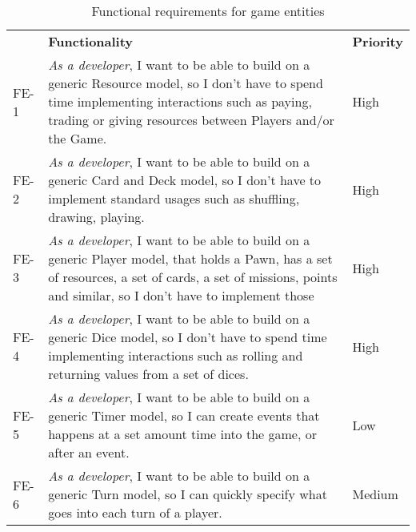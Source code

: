 \begin{table}
\centering
\caption{Functional requirements for game entities}
\label{freq:game_entities}
\begin{tabular}{ | m{1cm} | m{9cm}| m{1.5cm} | }
     & {\bf Functionality}                                                                                                                                                                                                                                                                                                     & {\bf Priority} \\
FE-1 & \emph{As a developer}, I want to be able to build on a generic Resource model, so I don't have to spend time implementing interactions such as paying, trading or giving resources between Players and/or the Game.                                                                 & High           \\
FE-2 & \emph{As a developer}, I want to be able to build on a generic Card and Deck model, so I don't have to implement standard usages such as shuffling, drawing, playing.                                                                                                                                                          & High           \\
FE-3 & \emph{As a developer}, I want to be able to build on a generic Player model, that holds a Pawn, has a set of resources, a set of cards, a set of missions, points and  similar, so I don't have to implement those & High           \\
FE-4 & \emph{As a developer}, I want to be able to build on a generic Dice model, so I don't have to spend time implementing interactions such as rolling and returning values from a set of dices. & High           \\
FE-5 & \emph{As a developer}, I want to be able to build on a generic Timer model, so I can create events that happens at a set amount time into the game, or after an event.                                                                                                                                                         & Low            \\
FE-6 & \emph{As a developer}, I want to be able to build on a generic Turn model, so I can quickly specify what goes into each turn of a player.                                                                                                                                                                                      & Medium         \\

\end{tabular}
\end{table}
